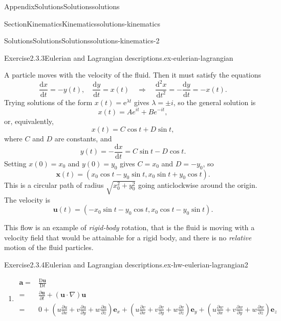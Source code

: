 \documentclass[oneside,10pt,]{book}
\numberwithin{equation}{section}
\newcommand{\e}{\mathrm{e}}
\newcommand{\de}{\mathrm{d}}
\newcommand{\dd}[2]{\frac{\de#1}{\de#2}}
\newcommand{\DD}[2]{\frac{\mathrm{D}#1}{\mathrm{D}#2}}
\newcommand{\pd}[2]{\frac{\partial#1}{\partial#2}}
\newcommand{\bx}{\boldsymbol{x}}
\newcommand{\be}{\boldsymbol{e}}
\newcommand{\bu}{\boldsymbol{u}}
\newcommand{\ba}{\boldsymbol{a}}
\begin{document}
\begin{appendixptx}{Appendix}{Solutions}{}{Solutions}{}{}{solutions}
\begin{sectionptx}{Section}{Kinematics}{}{Kinematics}{}{}{solutions-kinematics}
\begin{solutions-subsection-numberless}{Solutions}{Solutions}{}{Solutions}{}{}{solutions-kinematics-2}
\begin{divisionsolution}{Exercise}{2.3.3}{Eulerian and Lagrangian descriptions.}{ex-eulerian-lagrangian}
\par\smallskip%
\noindent\hypertarget{ex-eulerian-lagrangian-3-main}{}A particle moves with the velocity of the fluid. Then it must satisfy the equations%
\begin{equation*}
\dd{x}{t} = -y(t),\quad \dd{y}{t} = x(t)
\quad\Rightarrow\quad
\dd{^2x}{t^2} = -\dd{y}{t} = -x(t).
\end{equation*}
Trying solutions of the form \(x(t)=\e^{\lambda t}\) gives \(\lambda=\pm i\), so the general solution is%
\begin{equation*}
x(t) = Ae^{it}+Be^{-it},
\end{equation*}
or, equivalently,%
\begin{equation*}
x(t) = C\cos t + D\sin t,
\end{equation*}
where \(C\) and \(D\) are constants, and%
\begin{equation*}
y(t) =-\dd{x}{t}= C\sin t - D\cos t.
\end{equation*}
Setting \(x(0)=x_0\) and \(y(0)=y_0\) gives \(C=x_0\) and \(D=-y_0\), so%
\begin{equation*}
\bx(t) = (x_0\cos t - y_0\sin t, x_0\sin t + y_0\cos t).
\end{equation*}
This is a circular path of radius \(\sqrt{x_0^2+y_0^2}\) going anticlockwise around the origin. The velocity is%
\begin{equation*}
\bu(t) = (-x_0\sin t - y_0\cos t, x_0\cos t - y_0\sin t).
\end{equation*}
%
\par
This flow is an example of \emph{rigid-body} rotation, that is the fluid is moving with a velocity field that would be attainable for a rigid body, and there is no \emph{relative} motion of the fluid particles.%
\end{divisionsolution}%
\begin{divisionsolution}{Exercise}{2.3.4}{Eulerian and Lagrangian descriptions.}{ex-hw-eulerian-lagrangian2}%
\begin{enumerate}[font=\bfseries,label=(\alph*),ref=\alph*]%
\item[(a)]\noindent\hypertarget{ex-hw-eulerian-lagrangian2-3-2-main}{}%
\begin{align*}
\ba=&\DD{\bu}{t} \\
=& \pd{\bu}{t} + (\bu \cdot \nabla) \bu\\
=&0+\left(u\pd{u}{x}+v\pd{u}{y}+w\pd{u}{z}\right)\be_x
+\left(u\pd{v}{x}+v\pd{v}{y}+w\pd{v}{z}\right)\be_y
+\left(u\pd{w}{x}+v\pd{w}{y}+w\pd{w}{z}\right)\be_z\\

\end{align*}
\end{enumerate}
\end{divisionsolution}
\end{solutions-subsection-numberless}
\end{sectionptx}
\end{appendixptx}
\end{document}
